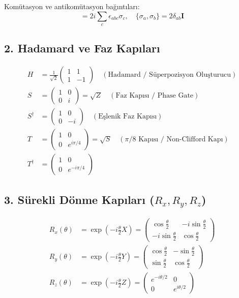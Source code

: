 \documentclass[11pt, a4paper]{article}
\begin{document}
Komütasyon ve antikomütasyon bağıntıları:
\begin{equation}
[\sigma_a, \sigma_b] = 2i \sum_c \epsilon_{abc} \sigma_c, \quad \{\sigma_a, \sigma_b\} = 2 \delta_{ab} \mathbf{I}
\end{equation}

\subsection{2. Hadamard ve Faz Kapıları}
\begin{align}
H &= \frac{1}{\sqrt{2}} \begin{pmatrix} 1 & 1 \\ 1 & -1 \end{pmatrix} \quad (\text{Hadamard / Süperpozisyon Oluşturucu}) \\
S &= \begin{pmatrix} 1 & 0 \\ 0 & i \end{pmatrix} = \sqrt{Z} \quad (\text{Faz Kapısı / Phase Gate}) \\
S^\dagger &= \begin{pmatrix} 1 & 0 \\ 0 & -i \end{pmatrix} \quad (\text{Eşlenik Faz Kapısı}) \\
T &= \begin{pmatrix} 1 & 0 \\ 0 & e^{i\pi/4} \end{pmatrix} = \sqrt{S} \quad (\text{$\pi/8$ Kapısı / Non-Clifford Kapı}) \\
T^\dagger &= \begin{pmatrix} 1 & 0 \\ 0 & e^{-i\pi/4} \end{pmatrix}
\end{align}

\subsection{3. Sürekli Dönme Kapıları ($R_x, R_y, R_z$)}
\begin{align}
R_x(\theta) &= \exp\left(-i \frac{\theta}{2} X\right) = \begin{pmatrix} \cos\frac{\theta}{2} & -i\sin\frac{\theta}{2} \\ -i\sin\frac{\theta}{2} & \cos\frac{\theta}{2} \end{pmatrix} \\
R_y(\theta) &= \exp\left(-i \frac{\theta}{2} Y\right) = \begin{pmatrix} \cos\frac{\theta}{2} & -\sin\frac{\theta}{2} \\ \sin\frac{\theta}{2} & \cos\frac{\theta}{2} \end{pmatrix} \\
R_z(\theta) &= \exp\left(-i \frac{\theta}{2} Z\right) = \begin{pmatrix} e^{-i\theta/2} & 0 \\ 0 & e^{i\theta/2} \end{pmatrix}
\end{align}
\end{document}
